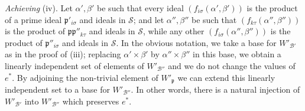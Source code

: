 \documentclass[12pt]{article}
\def\fp{{\mathfrak p}}
\def\ga{{\alpha}}
\def\gb{{\beta}}
\def\gs{{\sigma}}
\def\sB{{\mathcal B}}
\def\sS{{\mathcal S}}
\begin{document}
\medskip

\noindent \emph{Achieving} (iv). Let $\ga',\gb'$ be such that
every ideal $(f_{i\gs}(\ga',\gb'))$ is the product of a prime
ideal $\fp'_{i\gs}$ and ideals in $\sS$; 
and let $\ga'',\gb''$ be such that $(f_{k\tau}(\ga'',\gb''))$
is the product of $\fp\fp''_{k\tau}$ and ideals in $\sS$,
while any other $(f_{i\gs}(\ga'',\gb''))$ is the product of
$\fp''_{i\gs}$ and ideals in $\sS$. In the obvious notation,
we take a base for $W'_{\sB'}$ as in the proof of (iii);
replacing $\ga'\times\gb'$ by $\ga''\times\gb''$
in this base, we obtain a linearly
independent set of elements of $W'_{\sB''}$ and we do not
change the values of $e^*$. By adjoining the non-trivial
element of $W'_\fp$ we can extend this linearly independent
set to a base for $W'_{\sB''}$. In other words, there is a
natural injection of $W'_{\sB'}$ into $W'_{\sB''}$ which
preserves $e^*$.

\medskip
\end{document}
